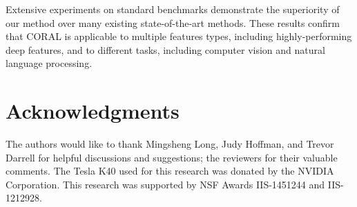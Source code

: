 \documentclass[letterpaper]{article}
\begin{document}
Extensive experiments on standard benchmarks demonstrate the superiority of our method over many existing state-of-the-art methods. These results confirm that CORAL is applicable to multiple features types, including highly-performing deep features, and to different tasks, including computer vision and natural language processing. 
\section{Acknowledgments}
\label{sec:ackn}
The authors would like to thank Mingsheng Long, Judy Hoffman, and Trevor Darrell for helpful discussions and suggestions; the reviewers for their valuable comments. The Tesla K40 used for this research was donated by the NVIDIA Corporation. This research was supported by NSF Awards IIS-1451244 and IIS-1212928. 


\end{document}
